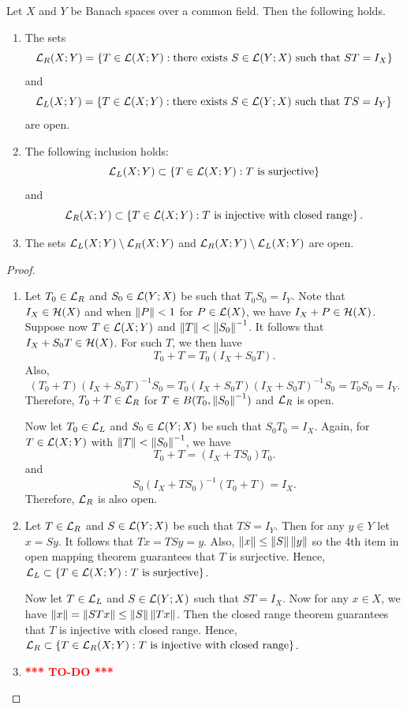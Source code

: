 \documentclass[a4paper]{article}
\newcommand{\TODO}{\textcolor{red}{\textbf{*** TO-DO ***}}}
\begin{document}
\begin{thm}
Let $X$ and $Y$ be Banach spaces over a common field. Then the following holds.
\begin{enumerate}
\item The sets 
\[
\mathcal{L}_R(X; Y) = \left\{ T \in \mathcal{L}(X; Y) : \text{there exists $S \in \mathcal{L}(Y; X)$ such that $ST = I_X$} \right\}
\]
and 
\[
\mathcal{L}_L(X; Y) = \left\{ T \in \mathcal{L}(X; Y) : \text{there exists $S \in \mathcal{L}(Y; X)$ such that $TS = I_Y$} \right\}
\]
are open.
\item The following inclusion holds: 
\[
\mathcal{L}_L(X; Y) \subset \left\{ T \in \mathcal{L}(X; Y) : \text{$T$ is surjective} \right\}
\]
and 
\[
\mathcal{L}_R(X; Y) \subset \left\{ T \in \mathcal{L}(X; Y) : \text{$T$ is injective with closed range} \right\}.
\]
\item The sets $\mathcal{L}_L(X; Y) \setminus \mathcal{L}_R(X; Y)$ and $\mathcal{L}_R(X; Y) \setminus \mathcal{L}_L(X; Y)$ are open.
\end{enumerate}
\end{thm}

\begin{proof}
\begin{enumerate}
\item Let $T_0 \in \mathcal{L}_R$ and $S_0 \in \mathcal{L}(Y; X)$ be such that 
$T_0 S_0 = I_Y$. Note that $I_X \in \mathcal{H}(X)$ and when $\left\lVert P\right\rVert < 1$
for $P \in \mathcal{L}(X)$, we have $I_X + P \in \mathcal{H}(X)$. Suppose now 
$T \in \mathcal{L}(X; Y)$ and $\left\lVert T\right\rVert < \left\lVert S_0\right\rVert^{-1}$. It follows that 
$I_X + S_0 T \in \mathcal{H}(X)$. For such $T$, we then have 
\[
T_0 + T = T_0 (I_X + S_0 T).
\]
Also, 
\[
(T_0 + T) (I_X + S_0 T)^{-1} S_0 = T_0 (I_X + S_0 T) (I_X + S_0 T)^{-1} S_0
= T_0 S_0 = I_Y.
\]
Therefore, $T_0 + T \in \mathcal{L}_R$ for $T \in B(T_0, \left\lVert S_0\right\rVert^{-1})$ 
and $\mathcal{L}_R$ is open.

Now let $T_0 \in \mathcal{L}_L$ and $S_0 \in \mathcal{L}(Y; X)$ be such that 
$S_0 T_0 = I_X$. Again, for $T \in \mathcal{L}(X; Y)$ with 
$\left\lVert T\right\rVert < \left\lVert S_0\right\rVert^{-1}$, we have 
\[
T_0 + T = (I_X + T S_0) T_0.
\]
and 
\[
S_0 (I_X + T S_0)^{-1} (T_0 + T) = I_X.
\]
Therefore, $\mathcal{L}_R$ is also open.

\item Let $T \in \mathcal{L}_R$ and $S \in \mathcal{L}(Y; X)$ be such that 
$TS = I_Y$. Then for any $y \in Y$ let $x = Sy$. It follows 
that $Tx = TSy = y$. Also, $\left\lVert x\right\rVert \leq \left\lVert S\right\rVert \left\lVert y\right\rVert$
so the 4th item in open mapping theorem guarantees that $T$ is 
surjective. Hence, $\mathcal{L}_L \subset \left\{ T \in \mathcal{L}(X; Y) :  
\text{$T$ is surjective}\right\}$.

Now let $T \in \mathcal{L}_L$ and $S \in \mathcal{L}(Y; X)$ such that 
$ST = I_X$. Now for any $x \in X$, we have $\left\lVert x\right\rVert 
= \left\lVert STx\right\rVert \leq \left\lVert S\right\rVert \left\lVert Tx\right\rVert$. Then the closed 
range theorem guarantees that $T$ is injective with closed 
range. Hence, $\mathcal{L}_R \subset \left\{ T \in \mathcal{L}_R(X; Y) : 
\text{$T$ is injective with closed range} \right\}$.

\item \TODO
\end{enumerate}

\end{proof}
\end{document}
